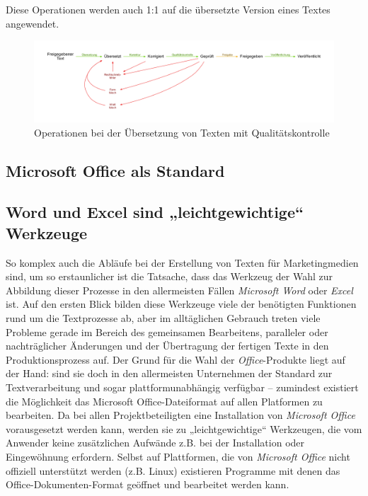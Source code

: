 \documentclass[11pt,a4paper]{article}
\begin{document}
Diese Operationen werden auch 1:1 auf die übersetzte Version eines Textes angewendet.

\begin{figure}[htb]
\begin{center}
\includegraphics[width=\textwidth]{media/chart-5.pdf}
\end{center}
\caption{Operationen bei der Übersetzung von Texten mit Qualitätskontrolle}
\label{chart:5}
\end{figure}

\subsection{Microsoft Office als Standard}

\subsection{Word und Excel sind „leichtgewichtige“ Werkzeuge}

So komplex auch die Abläufe bei der Erstellung von Texten für Marketingmedien sind, um so erstaunlicher ist die Tatsache, dass das Werkzeug der Wahl zur Abbildung dieser Prozesse in den allermeisten Fällen \emph{Microsoft Word} oder \emph{Excel} ist. Auf den ersten Blick bilden diese Werkzeuge viele der benötigten Funktionen rund um die Textprozesse ab, aber im alltäglichen Gebrauch treten viele Probleme gerade im Bereich des gemeinsamen Bearbeitens, paralleler oder nachträglicher Änderungen und der Übertragung der fertigen Texte in den Produktionsprozess auf. Der Grund für die Wahl der \emph{Office}-Produkte liegt auf der Hand: sind sie doch in den allermeisten Unternehmen der Standard zur Textverarbeitung und sogar plattformunabhängig verfügbar – zumindest existiert die Möglichkeit das Microsoft Office-Dateiformat auf allen Platformen zu bearbeiten. Da bei allen Projektbeteiligten eine Installation von \emph{Microsoft Office} vorausgesetzt werden kann, werden sie zu „leichtgewichtige“ Werkzeugen, die vom Anwender keine zusätzlichen Aufwände z.B. bei der Installation oder Eingewöhnung erfordern. Selbst auf Plattformen, die von \emph{Microsoft Office} nicht offiziell unterstützt werden (z.B. Linux) existieren Programme mit denen das Office-Dokumenten-Format geöffnet und bearbeitet werden kann.
\end{document}
